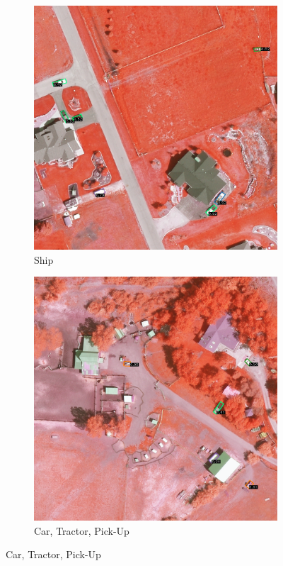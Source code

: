 \begin{figure}[h!]
    \begin{subfigure}[t]{0.38\textwidth}
        \centering
        \includegraphics[width=\linewidth]{images/015Results/02perm_exp/comp_images/rgir/509.png}
        \caption{Ship}
    \end{subfigure}
    \begin{subfigure}[t]{0.38\textwidth}
        \centering
        \includegraphics[width=\linewidth]{images/015Results/02perm_exp/comp_images/rgir/523.png}
        \caption{Car, Tractor, Pick-Up}
    \end{subfigure}
    

\end{figure}

